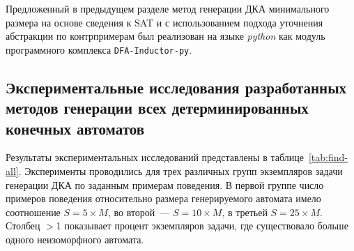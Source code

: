 Предложенный в предыдущем разделе метод генерации ДКА минимального размера на основе сведения к SAT и с использованием подхода уточнения абстракции по контрпримерам был реализован на языке \emph{python} как модуль программного комплекса \texttt{DFA-Inductor-py}.


\subsection{Экспериментальные исследования разработанных методов генерации всех детерминированных конечных автоматов}
\label{sec:findall:results:dfs}

Результаты экспериментальных исследований представлены в таблице~\ref{tab:find-all}.
Эксперименты проводились для трех различных групп экземпляров задачи генерации ДКА по заданным примерам поведения.
В первой группе число примеров поведения относительно размера генерируемого автомата имело соотношение $S = 5 \times M$,
во второй~--- $S = 10 \times M$, в третьей $S = 25 \times M$.
Столбец $>$1 показывает процент экземпляров задачи, где существовало больше одного неизоморфного автомата.

